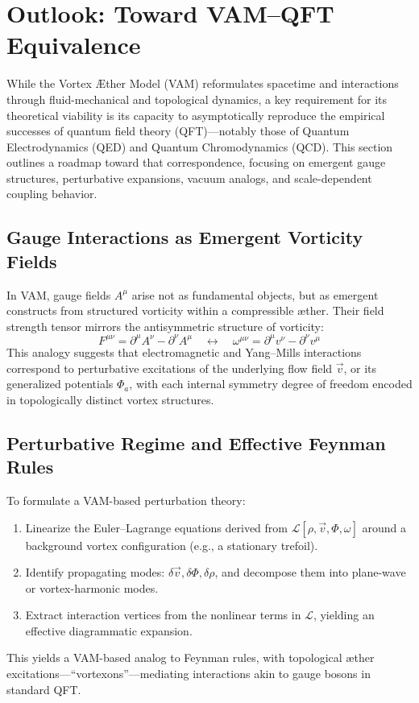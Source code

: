 \section{Outlook: Toward VAM–QFT Equivalence}\label{sec:vam_qft_outlook}

While the Vortex \AE ther Model (VAM) reformulates spacetime and interactions through fluid-mechanical and topological dynamics, a key requirement for its theoretical viability is its capacity to asymptotically reproduce the empirical successes of quantum field theory (QFT)—notably those of Quantum Electrodynamics (QED) and Quantum Chromodynamics (QCD). This section outlines a roadmap toward that correspondence, focusing on emergent gauge structures, perturbative expansions, vacuum analogs, and scale-dependent coupling behavior.

\subsection{Gauge Interactions as Emergent Vorticity Fields}

In VAM, gauge fields \( A^\mu \) arise not as fundamental objects, but as emergent constructs from structured vorticity within a compressible æther. Their field strength tensor mirrors the antisymmetric structure of vorticity:
\begin{equation}
    F^{\mu\nu} = \partial^\mu A^\nu - \partial^\nu A^\mu
    \quad \longleftrightarrow \quad
    \omega^{\mu\nu} = \partial^\mu v^\nu - \partial^\nu v^\mu
\end{equation}
This analogy suggests that electromagnetic and Yang–Mills interactions correspond to perturbative excitations of the underlying flow field \( \vec{v} \), or its generalized potentials \( \Phi_a \), with each internal symmetry degree of freedom encoded in topologically distinct vortex structures.

\subsection{Perturbative Regime and Effective Feynman Rules}

To formulate a VAM-based perturbation theory:
\begin{enumerate}
    \item Linearize the Euler–Lagrange equations derived from \( \mathcal{L}[\rho, \vec{v}, \Phi, \omega] \) around a background vortex configuration (e.g., a stationary trefoil).
    \item Identify propagating modes: \( \delta \vec{v}, \delta \Phi, \delta \rho \), and decompose them into plane-wave or vortex-harmonic modes.
    \item Extract interaction vertices from the nonlinear terms in \( \mathcal{L} \), yielding an effective diagrammatic expansion.
\end{enumerate}
This yields a VAM-based analog to Feynman rules, with topological æther excitations—“vortexons”—mediating interactions akin to gauge bosons in standard QFT.

